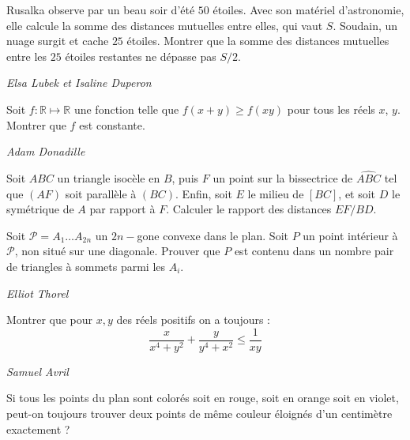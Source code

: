 \begin{exo}{}
Rusalka observe par un beau soir d'été $50$ étoiles. Avec son matériel d'astronomie, elle calcule la somme des distances mutuelles entre elles, qui vaut $S$. Soudain, un nuage surgit et cache $25$ étoiles. Montrer que la somme des distances mutuelles entre les $25$ étoiles restantes ne dépasse pas $S/2$.

\medskip
\textit{Elsa Lubek et Isaline Duperon}

\end{exo}


\begin{exo}{ }
Soit $f : \mathbb{R} \mapsto \mathbb{R}$ une fonction telle que $f(x+y) \geq f(xy)$ pour tous les réels $x$, $y$.
Montrer que $f$ est constante.

\medskip
\textit{Adam Donadille}
\end{exo}

\begin{exo}{}
Soit $ABC$ un triangle isocèle en $B$, puis $F$ un point sur la bissectrice de $\widehat{ABC}$ tel que $(AF)$ soit parallèle à $(BC)$.
Enfin, soit $E$ le milieu de $[BC]$, et soit $D$ le symétrique de $A$ par rapport à $F$.
Calculer le rapport des distances $EF / BD$.
\end{exo}

\begin{exo}{}
Soit $\mathcal{P}=A_1\ldots A_{2n}$ un $2n-$gone convexe dans le plan. Soit $P$ un point intérieur à $\mathcal{P}$, non situé sur une diagonale. Prouver que $P$ est contenu dans un nombre pair de triangles à sommets parmi les $A_i$.

\medskip
\textit{Elliot Thorel}
\end{exo}




\begin{exo}{}
Montrer que pour $x,y$ des réels positifs on a toujours :
$$\frac{x}{x^4+y^2}+\frac{y}{y^4+x^2}\leq \frac{1}{xy}$$

\medskip
\textit{Samuel Avril}
 \end{exo}

\begin{exo}{}
Si tous les points du plan sont colorés soit en rouge, soit en orange soit en violet, peut-on toujours trouver deux points de même couleur éloignés d'un centimètre exactement ?
\end{exo}


